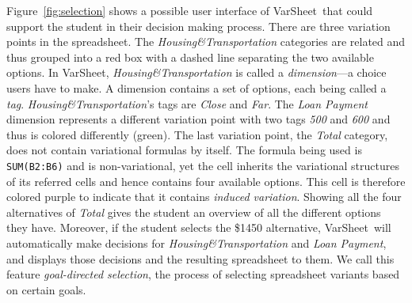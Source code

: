 \documentclass[conference]{IEEEtran}
\newcommand{\prog}[1]{{\small\texttt{#1}}}
\newcommand{\varsheet}{VarSheet}
\newcommand{\gds}{goal-directed selection}
\newcommand{\mapname}[1]{\textit{#1}}
\newcommand{\htdim}{Housing\&Transportation}
\newcommand{\lpdim}{Loan Payment}
\begin{document}
Figure~\ref{fig:selection} shows a possible user interface of \varsheet~that could support the student in their decision making process.
There are three variation points in the spreadsheet. The \mapname{\htdim} categories are related and thus grouped
into a red box with a dashed line separating the two available options. 
In \varsheet, \mapname{\htdim} is called a \emph{dimension}---a choice users have to make. A dimension contains a set of options, each being called a \emph{tag}.
\mapname{\htdim}'s tags are \mapname{Close} and \mapname{Far}.
The \mapname{\lpdim} dimension represents a different variation point with two tags \mapname{500} and \mapname{600}
 and thus is colored differently (green). 
The last variation point, the \mapname{Total} category, does not contain variational formulas by itself. The formula being
used is \prog{SUM(B2:B6)} and is non-variational, yet the cell inherits the variational structures of its referred cells and
hence contains four available options. This cell is therefore colored purple to indicate that it contains \emph{induced variation}. Showing all the four alternatives of 
\mapname{Total} gives the student an overview of all the different options they
have. Moreover, if the student selects the \$1450 alternative, \varsheet~will automatically make
decisions for \mapname{\htdim} and \mapname{\lpdim}, and displays those decisions and the resulting spreadsheet to them.
We call this feature \emph{\gds}, the process of selecting spreadsheet variants based on certain goals.
\end{document}
